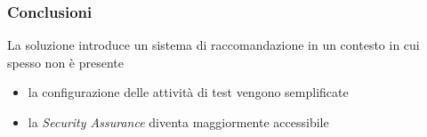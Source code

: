 \begin{frame}
    \frametitle{Conclusioni}
    La soluzione introduce un sistema di raccomandazione in un contesto in cui spesso non è presente %
    \begin{itemize}
        \item la configurazione delle \alert{attività di test} vengono \alert{semplificate} 
        \item la \textit{Security Assurance} diventa maggiormente accessibile%
    \end{itemize}
\end{frame}
